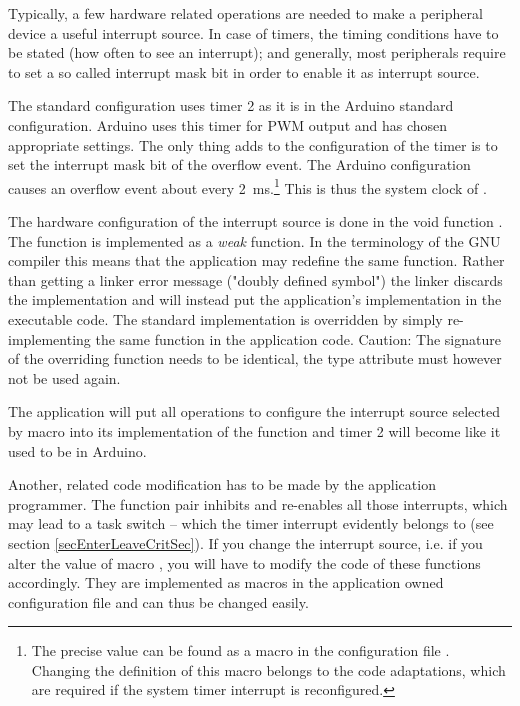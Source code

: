 Typically, a few hardware related operations are needed to make a
peripheral device a useful interrupt source. In case of timers, the timing
conditions have to be stated (how often to see an interrupt); and
generally, most peripherals require to set a so called interrupt mask bit
in order to enable it as interrupt source.

The \rtos{} standard configuration uses timer 2 as it is in the Arduino
standard configuration. Arduino uses this timer for PWM output and has
chosen appropriate settings. The only thing \rtos{} adds to the
configuration of the timer is to set the interrupt mask bit of the
overflow event. The Arduino configuration causes an overflow event about
every 2~ms.\footnote{The precise value can be found as a macro in the
\rtos{} configuration file . Changing the definition of
this macro belongs to the code adaptations, which are required if the
system timer interrupt is reconfigured.} This is thus the system clock of
\rtos{}.

The hardware configuration of the interrupt source is done in the void
function . The function is
implemented as a \emph{weak} function. In the terminology of the GNU
compiler this means that the application may redefine the same function.
Rather than getting a linker error message ("doubly defined symbol") the
linker discards the \rtos{} implementation and will instead put the
application's implementation in the executable code. The standard
implementation is overridden by simply re-implementing the same function
in the application code. Caution: The signature of the overriding function
needs to be identical, the type attribute  must however not be
used again.

The application will put all operations to configure the interrupt source
selected by macro  into its
implementation of the function and timer 2 will become like it used to be
in Arduino.

Another, related code modification has to be made by the application
programmer. The function pair
 inhibits and
re-enables all those interrupts, which may lead to a task switch -- which
the timer interrupt evidently belongs to (see section
\ref{secEnterLeaveCritSec}). If you change the interrupt source, i.e. if
you alter the value of macro , you
will have to modify the code of these functions accordingly. They are
implemented as macros in the application owned configuration file
 and can thus be changed easily.


